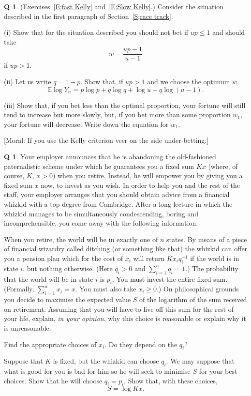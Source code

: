 \documentclass[12pt,a4paper]{article}
\theoremstyle{plain}
\theoremstyle{definition}
\newtheorem{question}[theorem]{Q}
\begin{document}
\begin{question}\label{C2.8} 
(Exercises~\ref{E;fast Kelly}
and~\ref{E;Slow Kelly}.) Consider the situation
described in the first paragraph of Section~\ref{S;race track}.

(i) Show that for the situation described
you should not bet if $up\leq 1$ and should take
\[w=\frac{up-1}{u-1}\]
if $up>1$.

(ii) Let us write $q=1-p$. Show that, if $up>1$ and we choose
the optimum $w$,
\[{\mathbb E}\log Y_{n}=p\log p+q\log q+\log u-q\log(u-1).\]

(iii) Show that,
if you bet less than the optimal proportion, your fortune
will still tend to increase but more slowly, but, if you bet
more than some proportion $w_{1}$, your fortune will decrease.
Write down the equation for $w_{1}$.

[Moral: If you use the Kelly criterion veer on the side under-betting.]
\end{question}
\begin{question}\label{C2.9} Your employer announces that he is
abandoning the old-fashioned paternalistic scheme
under which he guarantees you a fixed sum $Kx$
(where, of course, $K,\,x>0$)
when you retire. Instead, he will empower you by
giving you a fixed sum $x$ now, to invest as you wish.
In order to help you
and the rest of the staff, your employer  
arranges that you should obtain advice 
from a financial whizkid with a top degree
from Cambridge. After a long lecture in which the whizkid
manages to be simultaneously condescending, boring
and incomprehensible, you come away with the following information.

When you retire,  the world will be in exactly
one of $n$ states. By means of a piece of financial
wizardry called ditching (or something like that)
the whizkid can offer you a pension plan which
for the cost of $x_{i}$ will return $Kx_{i}q_{i}^{-1}$
if the world is in state $i$, but nothing otherwise.
(Here  $q_{i}> 0$ and $\sum_{i=1}^{n}q_{i}=1$.)
The probability that the world will be in state $i$
is $p_{i}$. You must invest the entire fixed
sum. (Formally, $\sum_{i=1}^{n}x_{i}=x$. You must also take
$x_{i}\geq 0$.) On philosophical grounds you decide
to maximise the expected value $S$ of the logarithm
of the sum received on retirement.
Assuming that you will have to live
off this sum for the rest of your life,
explain, \emph{in your opinion}, why this choice is
reasonable or explain why it is unreasonable.

Find the appropriate choices of $x_{i}$.
Do they depend on the $q_{i}$?

Suppose that $K$ is fixed, but the whizkid can choose
$q_{i}$. We may suppose that what is good for you is bad for him
so
he will seek to minimise $S$ for your best choices.  
Show that he will choose $q_{i}=p_{i}$.
Show that,
with these choices,
\[S=\log Kx.\]
\end{question}
\end{document}
